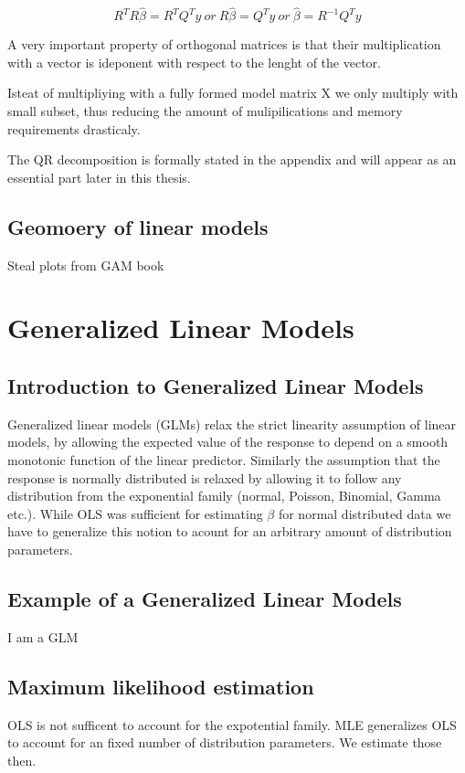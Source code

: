 \documentclass{article}
\begin{document}
    \begin{equation} R^T R \widehat{\beta} = R^TQ^T y  \ or \   R\widehat{\beta}=Q^T y \ or \  \widehat{\beta} = R^{-1} Q^T y \end{equation}

    A very important property of orthogonal matrices is that their multiplication with a  vector is ideponent with respect to the lenght of the vector.

    Isteat of multipliying with a fully formed model matrix X we only multiply with small subset, thus reducing the amount of mulipilications and memory requirements drasticaly.

    The QR decomposition is formally stated in the appendix and will appear as an essential part later in this thesis.

    \subsection{Geomoery of linear models}
    Steal plots from GAM book

    \section{Generalized Linear Models}
    \subsection{Introduction to Generalized Linear Models}
    Generalized linear models (GLMs) relax the strict linearity assumption of linear models, by allowing the expected value of the response to depend on a smooth monotonic function of the linear predictor. Similarly the assumption that the response is normally distributed is relaxed by allowing it to follow any distribution from the exponential family (normal, Poisson, Binomial, Gamma etc.). While OLS was sufficient for estimating $\beta$ for normal distributed data we have to generalize this notion to acount for an arbitrary amount of distribution parameters.
    \subsection{Example of a Generalized Linear Models}
    I am a GLM
    \subsection{Maximum likelihood estimation}
    OLS is not sufficent to account for the expotential family. MLE generalizes OLS to account for an fixed number of distribution parameters. We estimate those then.
\end{document}
